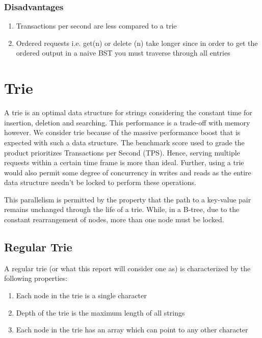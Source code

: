 \documentclass{article}
\begin{document}
\subsubsection{Disadvantages}

\begin{enumerate}
    \item Transactions per second are less compared to a trie 
    \item Ordered requests i.e. get(n) or delete (n) take longer since in order to get the ordered output in a naive BST you must traverse through all entries   
\end{enumerate}

\section{Trie}

A trie is an optimal data structure for strings considering the constant time for insertion, deletion and searching. This performance is a trade-off with memory however. We consider trie because of the massive performance boost that is expected with such a data structure. The benchmark score used to grade the product prioritizes Transactions per Second (TPS). Hence, serving multiple requests within a certain time frame is more than ideal. Further, using a trie would also permit some degree of concurrency in writes and reads as the entire data structure needn't be locked to perform these operations.

This parallelism is permitted by the property that the path to a key-value pair remains unchanged through the life of a trie. While, in a B-tree, due to the constant rearrangement of nodes, more than one node must be locked. 

\subsection{Regular Trie}

A regular trie (or what this report will consider one as) is characterized by the following properties:

\begin{enumerate}
    \item Each node in the trie is a single character
    \item Depth of the trie is the maximum length of all strings
    \item Each node in the trie has an array which can point to any other character
\end{enumerate}
\end{document}
